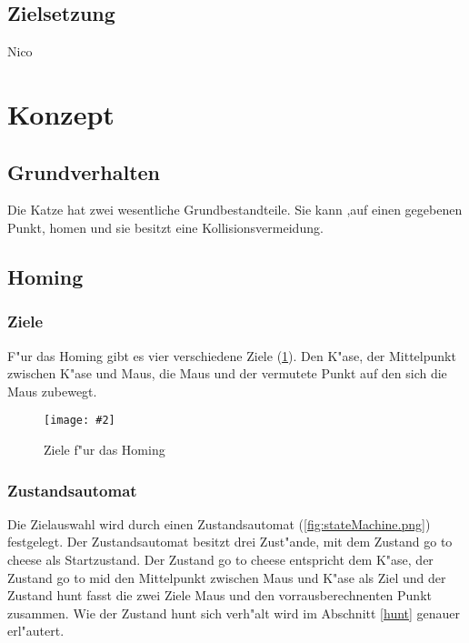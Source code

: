 \documentclass[
a4paper,     %
12pt         %
]{scrartcl}  %
\newcommand{\mygraphics}[3]{
\begin{figure}[!h]
  \begin{center}
    \texttt{[image: \#2]} \\    
    \caption{#3}\label{fig:#2}
  \end{center}
\end{figure}

}
\begin{document}
\subsection{Zielsetzung}
Nico
\clearpage

\section{Konzept}
\subsection{Grundverhalten}
Die Katze hat zwei wesentliche Grundbestandteile. Sie kann ,auf einen gegebenen Punkt, \glqq homen\grqq{} und sie besitzt eine Kollisionsvermeidung.
\subsection{Homing}
\subsubsection{Ziele}
F"ur das Homing gibt es vier verschiedene Ziele (\ref{fig:homingZiele.png}). Den K"ase, der Mittelpunkt zwischen K"ase und Maus, die Maus und der vermutete Punkt auf den sich die Maus zubewegt.
\mygraphics{0.7\textwidth}{homingZiele.png}{Ziele f"ur das Homing}
\clearpage
\subsubsection{Zustandsautomat}
Die Zielauswahl wird durch einen Zustandsautomat (\ref{fig:stateMachine.png}) festgelegt.
Der Zustandsautomat besitzt drei Zust"ande, mit dem Zustand \glqq go to cheese\grqq{} als Startzustand. Der Zustand \glqq go to cheese\grqq{} entspricht dem K"ase, der Zustand \glqq go to mid\grqq{} den Mittelpunkt zwischen Maus und K"ase als Ziel und der Zustand \glqq hunt\grqq{} fasst die zwei Ziele Maus und den vorrausberechnenten Punkt zusammen. Wie der Zustand \glqq hunt\grqq{} sich verh"alt wird im Abschnitt \ref{hunt} genauer erl"autert.\\
\hspace*{0.63\textwidth}
\end{document}
